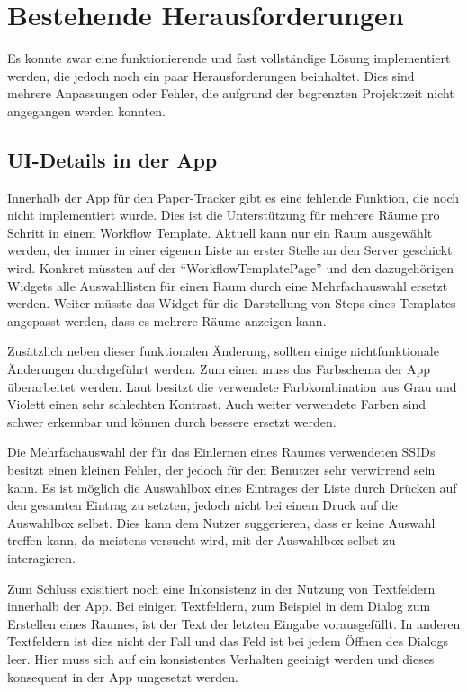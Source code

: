 \section{Bestehende Herausforderungen}

Es konnte zwar eine funktionierende und fast vollständige Lösung implementiert werden, die jedoch noch ein paar
Herausforderungen beinhaltet.
Dies sind mehrere Anpassungen oder Fehler, die aufgrund der begrenzten Projektzeit nicht angegangen werden konnten.

\subsection{\gls{UI}-Details in der App}

Innerhalb der App für den Paper-Tracker gibt es eine fehlende Funktion, die noch nicht implementiert wurde.
Dies ist die Unterstützung für mehrere Räume pro Schritt in einem Workflow Template.
Aktuell kann nur ein Raum ausgewählt werden, der immer in einer eigenen Liste an erster Stelle an den Server geschickt wird.
Konkret müssten auf der \enquote{WorkflowTemplatePage} und den dazugehörigen Widgets alle Auswahllisten für einen Raum durch
eine Mehrfachauswahl ersetzt werden.
Weiter müsste das Widget für die Darstellung von Steps eines Templates angepasst werden, dass es mehrere Räume anzeigen kann.

Zusätzlich neben dieser funktionalen Änderung, sollten einige nichtfunktionale Änderungen durchgeführt werden.
Zum einen muss das Farbschema der App überarbeitet werden.
Laut  besitzt die verwendete Farbkombination aus Grau und Violett einen sehr schlechten Kontrast.
Auch weiter verwendete Farben sind schwer erkennbar und können durch bessere ersetzt werden.

Die Mehrfachauswahl der für das Einlernen eines Raumes verwendeten \gls{SSID}s besitzt einen kleinen Fehler, der jedoch
für den Benutzer sehr verwirrend sein kann.
Es ist möglich die Auswahlbox eines Eintrages der Liste durch Drücken auf den gesamten Eintrag zu setzten, jedoch nicht
bei einem Druck auf die Auswahlbox selbst.
Dies kann dem Nutzer suggerieren, dass er keine Auswahl treffen kann, da meistens versucht wird, mit der Auswahlbox selbst
zu interagieren.

Zum Schluss exisitiert noch eine Inkonsistenz in der Nutzung von Textfeldern innerhalb der App.
Bei einigen Textfeldern, zum Beispiel in dem Dialog zum Erstellen eines Raumes, ist der Text der letzten Eingabe vorausgefüllt.
In anderen Textfeldern ist dies nicht der Fall und das Feld ist bei jedem Öffnen des Dialogs leer.
Hier muss sich auf ein konsistentes Verhalten geeinigt werden und dieses konsequent in der App umgesetzt werden.

